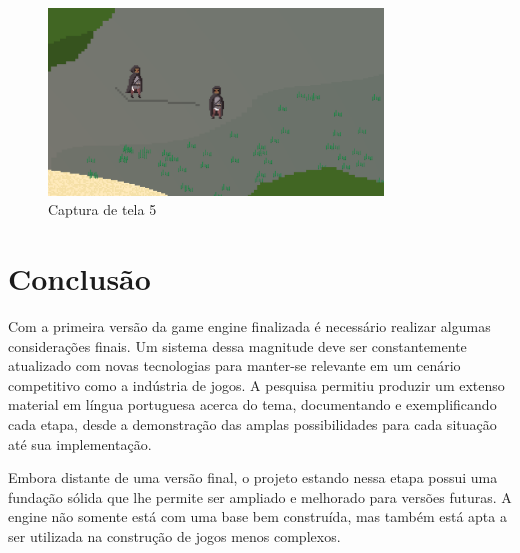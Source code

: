 \documentclass[12pt, 
openright, 
oneside, 
a4paper,    
brazil]{facom-ufu-abntex2}
\begin{document}
\begin{figure}[H]
	\centering
	\includegraphics[width=24em]{imagens/ss5.png}
	\caption{Captura de tela 5}
	\label{fig:ss5}
\end{figure}

\chapter{Conclusão}
\label{cap:conclusao}
Com a primeira versão da game engine finalizada é necessário realizar algumas considerações finais. Um sistema dessa magnitude deve ser constantemente atualizado com novas tecnologias para manter-se relevante em um cenário competitivo como a indústria de jogos. A pesquisa permitiu produzir um extenso material em língua portuguesa acerca do tema, documentando e exemplificando cada etapa, desde a demonstração das amplas possibilidades para cada situação até sua implementação.

Embora distante de uma versão final, o projeto estando nessa etapa possui uma fundação sólida que lhe permite ser ampliado e melhorado para versões futuras. A engine não somente está com uma base bem construída, mas também está apta a ser utilizada na construção de jogos menos complexos.
\end{document}
